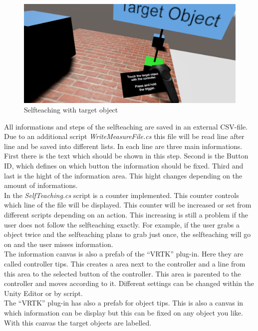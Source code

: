 \begin{figure}[H] 
	\center 
	\includegraphics[width=12cm]{Images/teaching3.PNG}
	\caption[Selfteaching with target object]{Selfteaching with target object}
	\label{fig:teaching3}
\end{figure}

All informations and steps of the selfteaching are saved in an external CSV-file. Due to an additional script \textit{WriteMeasureFile.cs} this file will be read line after line and be saved into different lists. In each line are three main informations. First there is the text which should be shown in this step. Second is the Button ID, which defines on which button the information should be fixed. Third and last is the hight of the information area. This hight changes depending on the amount of informations. \\
In the \textit{SelfTeaching.cs }script is a counter implemented. This counter controls which line of the file will be displayed. This counter will be increased or set from different scripts depending on an action. This increasing is still a problem if the user does not follow the selfteaching exactly. For example, if the user grabs a object twice and the selfteaching plans to grab just once, the selfteaching will go on and the user misses information. \\
The information canvas is also a prefab of the ``VRTK'' plug-in. Here they are called controller tips. This creates a area next to the controller and a line from this area to the selected button of the controller. This area is parented to the controller and moves according to it. Different settings can be changed within the Unity Editor or by script.\\
The ``VRTK'' plug-in has also a prefab for object tips. This is also a canvas in which information can be display but this can be fixed on any object you like. With this canvas the target objects are labelled.


\newpage